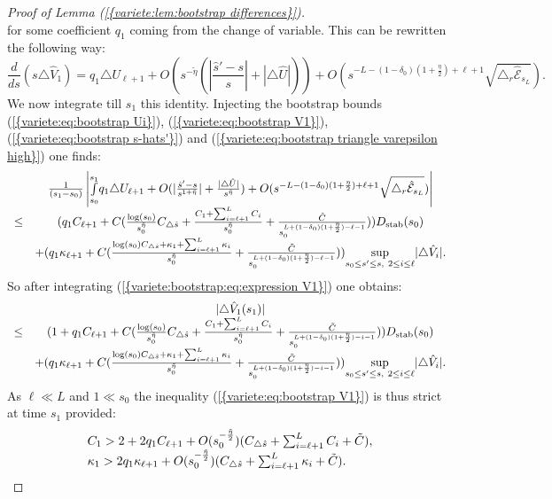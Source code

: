 \documentclass[11pt,a4paper,reqno]{amsart}
\theoremstyle{remark}
\numberwithin{equation}{section}
\begin{document}
\begin{proof}[Proof of Lemma {{\rm (\ref{{variete:lem:bootstrap differences}})}}]
$$$$
for some coefficient $q_1$ coming from the change of variable. This can be rewritten the following way:
\begin{equation} \label{variete:bootstrap:eq:expression V1}
\frac{d}{ds}(s\triangle \hat{V}_1)=q_1\triangle U_{\ell+1}+O(s^{-\tilde{\eta}}(|\frac{\hat{s}'-s}{s}|+|\triangle \hat{U}|))+O(s^{-L-(1-\delta_0)(1+\frac{\eta}{2})+\ell+1}\sqrt{\triangle_r \hat{\mathcal{E}}_{s_L}}).
\end{equation}
We now integrate till $s_1$ this identity. Injecting the bootstrap bounds {{\rm (\ref{{variete:eq:bootstrap Ui}})}}, {{\rm (\ref{{variete:eq:bootstrap V1}})}}, {{\rm (\ref{{variete:eq:bootstrap s-hats'}})}} and {{\rm (\ref{{variete:eq:bootstrap triangle varepsilon high}})}} one finds:
$$
\begin{array}{r c l}
&\frac{1}{(s_1-s_0)}\left|\underset{s_0}{\overset{s_1}{\int}}q_1\triangle U_{\ell+1}+O(|\frac{\hat{s}'-s}{s^{1+\tilde{\eta}}}|+\frac{|\triangle \hat{U}|}{s^{\tilde{\eta}}})+O(s^{-L-(1-\delta_0)(1+\frac{\eta}{2})+\ell+1}\sqrt{\triangle_r \hat{\mathcal{E}}_{s_L}}) \right| \\
\leq & (q_1C_{\ell+1}+C(\frac{\text{log}(s_0)}{s_0^{\tilde{\eta}}}C_{\triangle \hat{s}}+\frac{C_1+\sum_{i=\ell+1}^L C_i}{s_0^{\tilde{\eta}}}+\frac{\tilde{C}}{s_0^{L+(1-\delta_0)(1+\frac{\eta}{2})-\ell-1}}))D_{\text{stab}}(s_0)\\
&+(q_1\kappa_{\ell+1}+C(\frac{\text{log}(s_0)C_{\triangle \hat{s}}+\kappa_1+\sum_{i=\ell+1}^L \kappa_i}{s_0^{\tilde{\eta}}}+\frac{\tilde{C}}{s_0^{L+(1-\delta_0)(1+\frac{\eta}{2})-\ell-1}}))\underset{s_0\leq s' \leq s, \ 2\leq i \leq \ell}{\text{sup}}|\triangle \hat{V}_i|.
\end{array}
$$ 
So after integrating {{\rm (\ref{{variete:bootstrap:eq:expression V1}})}} one obtains:
$$
\begin{array}{r c l}
&|\triangle \hat{V}_1(s_1)|\\
\leq& (1+q_1C_{\ell+1}+C(\frac{\text{log}(s_0)}{s_0^{\tilde{\eta}}}C_{\triangle \hat{s}}+\frac{C_1+\sum_{i=\ell+1}^L C_i}{s_0^{\tilde{\eta}}}+\frac{\tilde{C}}{s_0^{L+(1-\delta_0)(1+\frac{\eta}{2})-i-1}}))D_{\text{stab}}(s_0)\\
&+(q_1\kappa_{\ell+1}+C(\frac{\text{log}(s_0)C_{\triangle \hat{s}}+\kappa_1+\sum_{i=\ell+1}^L \kappa_i}{s_0^{\tilde{\eta}}}+\frac{\tilde{C}}{s_0^{L+(1-\delta_0)(1+\frac{\eta}{2})-i-1}}))\underset{s_0\leq s' \leq s, \ 2\leq i \leq \ell}{\text{sup}}|\triangle \hat{V}_i|.
\end{array}
$$
As $\ell\ll L$ and $1\ll s_0$ the inequality {{\rm (\ref{{variete:eq:bootstrap V1}})}} is thus strict at time $s_1$ provided:
\begin{equation} \label{variete:bootstrap:condition V1}
\begin{array}{l l}
C_1>2+2q_1C_{\ell+1}+O(s_0^{-\frac{\tilde{\eta}}{2}})(C_{\triangle \hat{s}}+\sum_{i=\ell+1}^L C_i+\tilde{C}), \\
\kappa_1 > 2q_1\kappa_{\ell+1}+O(s_0^{-\frac{\tilde{\eta}}{2}})(C_{\triangle \hat{s}}+\sum_{i=\ell+1}^L \kappa_i+\tilde{C}).
\end{array}
\end{equation}


\end{proof}
\end{document}
